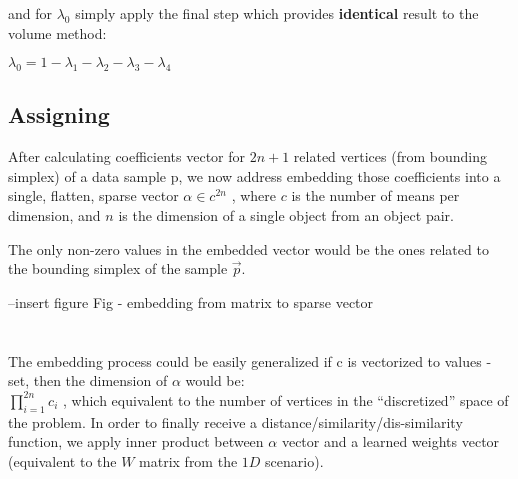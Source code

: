 		
		and for $\lambda_0$ simply apply the final step which provides \textbf{identical} result to the volume method:
		
		$\lambda_0 = 1 - \lambda_1 - \lambda_2 - \lambda_3 - \lambda_4$ \\
		
	\subsection{Assigning}
	
	After calculating coefficients vector for $2n+1$ related vertices (from bounding simplex) of a data sample p, we now address embedding those coefficients into a single, flatten, sparse vector $\alpha \in c^{2n}$ , where $c$ is the number of means per dimension, and $n$ is the dimension of a single object from an object pair.
	
	The only non-zero values in the embedded vector would be the ones related to the bounding simplex of the sample $\overrightarrow{p}$.
	
	
	
	
	--insert figure Fig - embedding from matrix to sparse vector
	 \\ \\ \\ 
	
	The embedding process could be easily generalized if c is vectorized to values - set, then the dimension of $\alpha$ would be:\\ 
	$\prod_{i=1}^{2n}c_i$ , which equivalent to the number of vertices in the “discretized” space of the problem.
	In order to finally receive a distance/similarity/dis-similarity function, we apply inner product between $\alpha$  vector and a learned weights vector (equivalent to the $W$ matrix from the $1D$ scenario).
	
	




